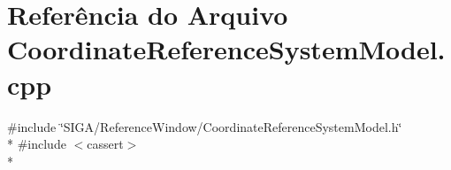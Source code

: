 \section{Referência do Arquivo Coordinate\+Reference\+System\+Model.\+cpp}
\label{_coordinate_reference_system_model_8cpp}
{\ttfamily \#include \char`\"{}S\+I\+G\+A/\+Reference\+Window/\+Coordinate\+Reference\+System\+Model.\+h\char`\"{}}\\*
{\ttfamily \#include $<$cassert$>$}\\*
